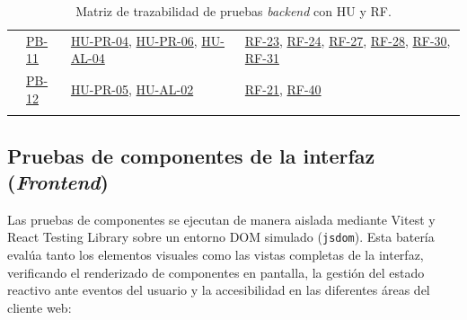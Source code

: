 \begin{table}[H]
{\begin{tabularx}{1.1\textwidth}{l l l Y}
               & \hyperref[pb:11]{PB-11} & \hyperref[hu:pr-04]{HU-PR-04}, \hyperref[hu:pr-06]{HU-PR-06}, \hyperref[hu:al-04]{HU-AL-04} & \hyperref[req:23]{RF-23}, \hyperref[req:24]{RF-24}, \hyperref[req:27]{RF-27}, \hyperref[req:28]{RF-28}, \hyperref[req:30]{RF-30}, \hyperref[req:31]{RF-31} \\
               & \hyperref[pb:12]{PB-12} & \hyperref[hu:pr-05]{HU-PR-05}, \hyperref[hu:al-02]{HU-AL-02} & \hyperref[req:21]{RF-21}, \hyperref[req:40]{RF-40} \\
      \bighline
    \end{tabularx}%
  }
  \caption{Matriz de trazabilidad de pruebas \textit{backend} con HU y RF.}
  \label{tab:trazabilidad_backend}
\end{table}

\subsection{Pruebas de componentes de la interfaz (\textit{Frontend})}\label{subsec:casos_componentes}

Las pruebas de componentes se ejecutan de manera aislada mediante Vitest y React Testing Library sobre un entorno DOM simulado (\texttt{jsdom}). Esta batería evalúa tanto los elementos visuales como las vistas completas de la interfaz, verificando el renderizado de componentes en pantalla, la gestión del estado reactivo ante eventos del usuario y la accesibilidad en las diferentes áreas del cliente web:

\begin{table}[H]
  \centering
  \small
  \renewcommand{\arraystretch}{1.3}
  \caption[Casos de prueba del \textit{frontend}: Módulo de autenticación.]{Casos de prueba de la capa \textit{frontend}: Módulo de autenticación y perfil.}
  \label{tab:casos_prueba_frontend_auth}
\end{table}

